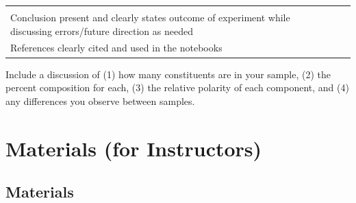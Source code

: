 \documentclass[]{tufte-book}
\begin{document}
\begin{longtable}[]{@{}llll@{}}
\begin{minipage}[t]{0.02\columnwidth}
\strut
\end{minipage} & \begin{minipage}[t]{0.02\columnwidth}\raggedright
\strut
\end{minipage}\tabularnewline
\begin{minipage}[t]{0.82\columnwidth}\raggedright
Conclusion present and clearly states outcome of experiment while discussing errors/future direction as needed\strut
\end{minipage} & \begin{minipage}[t]{0.02\columnwidth}\raggedright
\strut
\end{minipage} & \begin{minipage}[t]{0.02\columnwidth}\raggedright
\strut
\end{minipage} & \begin{minipage}[t]{0.02\columnwidth}\raggedright
\strut
\end{minipage}\tabularnewline
\begin{minipage}[t]{0.82\columnwidth}\raggedright
References clearly cited and used in the notebooks\strut
\end{minipage} & \begin{minipage}[t]{0.02\columnwidth}\raggedright
\strut
\end{minipage} & \begin{minipage}[t]{0.02\columnwidth}\raggedright
\strut
\end{minipage} & \begin{minipage}[t]{0.02\columnwidth}\raggedright
\strut
\end{minipage}\tabularnewline
\bottomrule
\end{longtable}

Include a discussion of (1) how many constituents are in your sample, (2) the percent composition for each, (3) the relative polarity of each component, and (4) any differences you observe between samples.

\hypertarget{gctcd-materials}{%
\section*{Materials (for Instructors)}\label{gctcd-materials}}

\hypertarget{materials}{%
\subsection*{Materials}\label{materials}}
\end{document}
